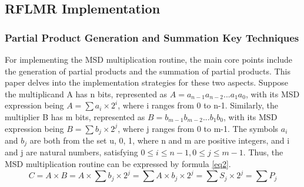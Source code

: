 \documentclass[electronics,article,accept,pdftex,moreauthors]{Definitions/mdpi}
\begin{document}
\begin{table}[H]
\caption{Five ternary logic operators of JW-MSD parallel adder}
\label{tab2}
\centering
{}

\end{table}

\subsection{RFLMR Implementation}
\subsubsection{Partial Product Generation and Summation Key Techniques}
For implementing the MSD  multiplication routine, the main core points include the generation of partial products and the summation of partial products. This paper delves into the implementation strategies for these two aspects. Suppose the multiplicand A has n bits, represented as $A=a_{n-1} a_{n-2}...a_1 a_0$, with its MSD expression being $A=\sum a_i \times 2^i$, where i ranges from 0 to n-1. Similarly, the multiplier B has m bits, represented as $B=b_{m-1} b_{m-2}...b_1 b_0$, with its MSD expression being $B=\sum b_j \times 2^j$, where j ranges from 0 to m-1. The symbols $a_i$ and $b_j$ are both from the set {u, 0, 1}, where n and m are positive integers, and i and j are natural numbers, satisfying $0 \leq i \leq n-1,0 \leq j \leq m-1$. Thus, the MSD multiplication routine can be expressed by formula \ref{eq2}.
\begin{equation}
C=A \times B=A \times \sum b_j \times 2^j = \sum A \times b_j \times 2^j=\sum S_j \times 2^j=\sum P_j
\label{eq2}
\end{equation}
\end{document}
